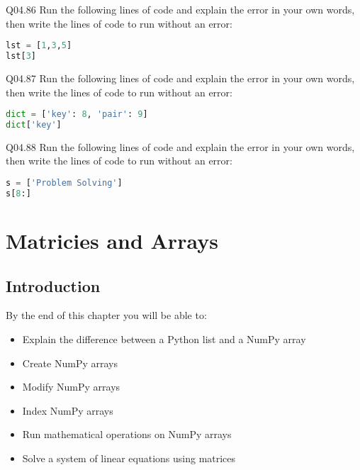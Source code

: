\documentclass{book}
\newenvironment{problems}{}{}  %
\begin{document}
\begin{problems}
Q04.86 Run the following lines of code and explain the error in your own
words, then write the lines of code to run without an error:

\begin{lstlisting}[language=Python]
lst = [1,3,5]
lst[3]
\end{lstlisting}

Q04.87 Run the following lines of code and explain the error in your own
words, then write the lines of code to run without an error:

\begin{lstlisting}[language=Python]
dict = ['key': 8, 'pair': 9]
dict['key']
\end{lstlisting}

Q04.88 Run the following lines of code and explain the error in your own
words, then write the lines of code to run without an error:

\begin{lstlisting}[language=Python]
s = ['Problem Solving']
s[8:]
\end{lstlisting}
        \end{problems}

    




    
        \hypertarget{matricies-and-arrays}{%
\chapter{Matricies and Arrays}\label{matricies-and-arrays}}
    




    
        \hypertarget{introduction}{%
\section{Introduction}\label{introduction}}
    




    
        By the end of this chapter you will be able to:

\begin{itemize}
\item
  Explain the difference between a Python list and a NumPy array
\item
  Create NumPy arrays
\item
  Modify NumPy arrays
\item
  Index NumPy arrays
\item
  Run mathematical operations on NumPy arrays
\item
  Solve a system of linear equations using matrices
\end{itemize}
        \newpage
\end{document}
